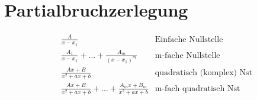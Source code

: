 \section{Partialbruchzerlegung}
\begin{tcolorbox}[colback=white!10!white,colframe=blue!50!black,title=Regeln]
    \begin{align*}
        &\frac{A}{x-x_1}&\text{Einfache Nullstelle}\\
        &\frac{A_1}{x-x_1}+ \ldots + \frac{A_m}{(x-x_1)^m }&\text{m-fache Nullstelle}\\
        &\frac{Ax+B}{x^2+ax+b} &\text{quadratisch (komplex) Nst}\\
        &\frac{Ax+B}{x^2+ax+b}+ \ldots + \frac{A_mx+B_m}{x^2+ax+b} &\text{m-fach quadratisch Nst}\\
    \end{align*}
\end{tcolorbox}
